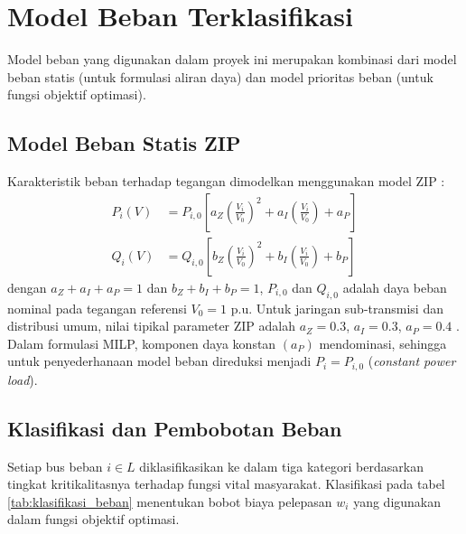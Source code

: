 \section{Model Beban Terklasifikasi}
\label{sec:Model_Beban_Terklasifikasi}

Model beban yang digunakan dalam proyek ini merupakan kombinasi dari model beban statis (untuk formulasi aliran daya) dan model prioritas beban (untuk fungsi objektif optimasi).

\subsection{Model Beban Statis ZIP}
\label{subsec:Model_Beban_Statis_ZIP}

Karakteristik beban terhadap tegangan dimodelkan menggunakan model ZIP \cite{Glover2017}:
\begin{equation}
    \begin{aligned}
        P_{i}(V) &= P_{i,0} \left[ a_{Z} \left(\frac{V_{i}}{V_{0}}\right)^{2} + a_{I} \left(\frac{V_{i}}{V_{0}}\right) + a_{P} \right] \\
        Q_{i}(V) &= Q_{i,0} \left[ b_{Z} \left(\frac{V_{i}}{V_{0}}\right)^{2} + b_{I} \left(\frac{V_{i}}{V_{0}}\right) + b_{P} \right]
    \end{aligned}
\end{equation}
dengan $a_{Z}+a_{I}+a_{P}=1$ dan $b_{Z}+b_{I}+b_{P}=1$, $P_{i,0}$ dan $Q_{i,0}$ adalah daya beban nominal pada tegangan referensi $V_{0}=1$ p.u. Untuk jaringan sub-transmisi dan distribusi umum, nilai tipikal parameter ZIP adalah $a_{Z}=0.3$, $a_{I}=0.3$, $a_{P}=0.4$ \cite{Glover2017}. Dalam formulasi MILP, komponen daya konstan $(a_{P})$ mendominasi, sehingga untuk penyederhanaan model beban direduksi menjadi $P_{i}=P_{i,0}$ (\textit{constant power load}).

\subsection{Klasifikasi dan Pembobotan Beban}
\label{subsec:Klasifikasi_dan_Pembobotan_Beban}

Setiap bus beban $i\in L$ diklasifikasikan ke dalam tiga kategori berdasarkan tingkat kritikalitasnya terhadap fungsi vital masyarakat. Klasifikasi pada tabel \ref{tab:klasifikasi_beban} menentukan bobot biaya pelepasan $w_{i}$ yang digunakan dalam fungsi objektif optimasi.

